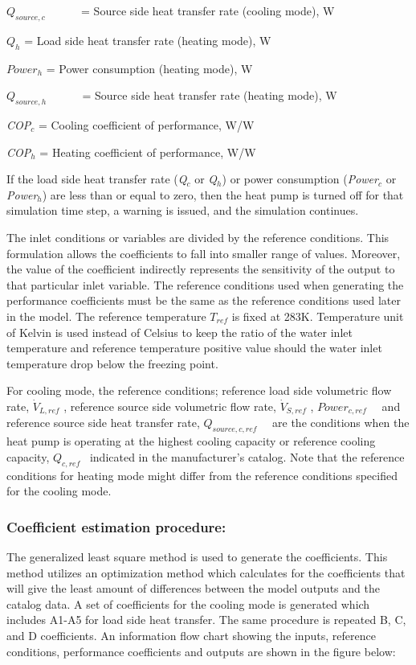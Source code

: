 \({Q_{source,c}}\) ~~~~~ = Source side heat transfer rate (cooling mode), W

\({Q_h}\) = Load side heat transfer rate (heating mode), W

\(Powe{r_h}\) = Power consumption (heating mode), W

\({Q_{source,h}}\) ~~~~~ = Source side heat transfer rate (heating mode), W

\emph{COP\(_{c}\)} = Cooling coefficient of performance, W/W

\emph{COP\(_{h}\)} = Heating coefficient of performance, W/W

If the load side heat transfer rate (\emph{Q\(_{c}\)} or \emph{Q\(_{h}\)}) or power consumption (\emph{Power\(_{c}\)} or \emph{Power\(_{h}\)}) are less than or equal to zero, then the heat pump is turned off for that simulation time step, a warning is issued, and the simulation continues.

The inlet conditions or variables are divided by the reference conditions. This formulation allows the coefficients to fall into smaller range of values. Moreover, the value of the coefficient indirectly represents the sensitivity of the output to that particular inlet variable. The reference conditions used when generating the performance coefficients must be the same as the reference conditions used later in the model. The reference temperature \({T_{ref}}\) is fixed at 283K. Temperature unit of Kelvin is used instead of Celsius to keep the ratio of the water inlet temperature and reference temperature positive value should the water inlet temperature drop below the freezing point.

For cooling mode, the reference conditions; reference load side volumetric flow rate, \({\dot V_{L,ref}}\) , reference source side volumetric flow rate, \({\dot V_{S,ref}}\) , \(Powe{r_{c,ref}}\) ~~and reference source side heat transfer rate, \({Q_{source,c,ref}}\) ~~are the conditions when the heat pump is operating at the highest cooling capacity or reference cooling capacity, \({Q_{c,ref}}\) ~indicated in the manufacturer's catalog. Note that the reference conditions for heating mode might differ from the reference conditions specified for the cooling mode.

\subsubsection{Coefficient estimation procedure:}\label{coefficient-estimation-procedure-1}

The generalized least square method is used to generate the coefficients. This method utilizes an optimization method which calculates for the coefficients that will give the least amount of differences between the model outputs and the catalog data. A set of coefficients for the cooling mode is generated which includes A1-A5 for load side heat transfer. The same procedure is repeated B, C, and D coefficients. An information flow chart showing the inputs, reference conditions, performance coefficients and outputs are shown in the figure below:

